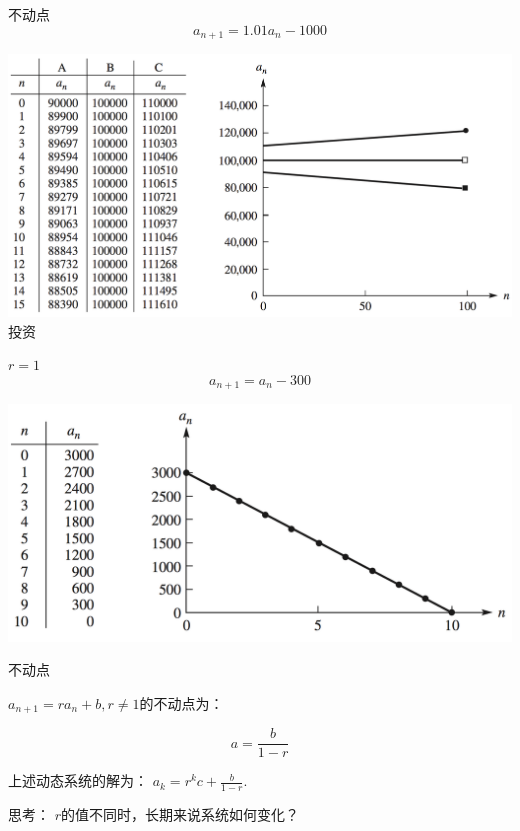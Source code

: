 \documentclass[UTF8]{ctexbeamer}
\begin{document}
\begin{frame}{不动点}
\[
a_{n+1} = 1.01a_n -1000
\]
  \begin{center}
    \includegraphics[width=.8\textwidth{}]{invest.png}\\
    投资
  \end{center}
  
\end{frame}

\begin{frame}{$r = 1$}
\[
a_{n+1} = a_n -300
\]
  \begin{center}
    \includegraphics[width=.8\textwidth{}]{poor.png}
  \end{center}
  
\end{frame}

\begin{frame}{不动点}

$a_{n+1} = ra_n + b, r \neq 1$的不动点为：

\[
a = \frac{b}{1-r}
\]

上述动态系统的解为： $a_k=r^kc+\frac{b}{1-r}$.

思考： $r$的值不同时，长期来说系统如何变化？
  
\end{frame}
\end{document}
